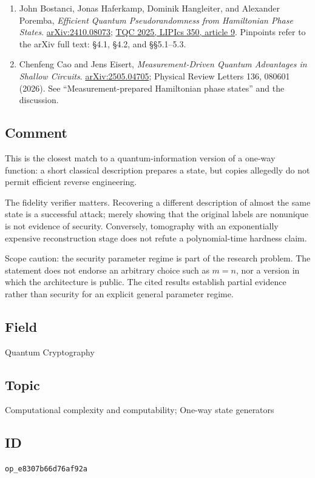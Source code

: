 \begin{enumerate}[label={},leftmargin=4.8em,labelsep=0.5em]
  \footnotesize
  \item[\textup{[Bostanci25]}]\label{ref:e830-bostanci25}
  John Bostanci, Jonas Haferkamp, Dominik Hangleiter, and Alexander Poremba, \emph{Efficient Quantum Pseudorandomness from Hamiltonian Phase States}. \href{https://arxiv.org/html/2410.08073}{arXiv:2410.08073}; \href{https://drops.dagstuhl.de/entities/document/10.4230/LIPIcs.TQC.2025.9}{TQC 2025, LIPIcs 350, article 9}. Pinpoints refer to the arXiv full text: §4.1, §4.2, and §§5.1–5.3.

  \item[\textup{[Cao26]}]\label{ref:e830-cao26}
  Chenfeng Cao and Jens Eisert, \emph{Measurement-Driven Quantum Advantages in Shallow Circuits}. \href{https://arxiv.org/html/2505.04705}{arXiv:2505.04705}; Physical Review Letters 136, 080601 (2026). See “Measurement-prepared Hamiltonian phase states” and the discussion.
\end{enumerate}

\subsection*{Comment}

This is the closest match to a quantum-information version of a one-way function: a short classical description prepares a state, but copies allegedly do not permit efficient reverse engineering.

The fidelity verifier matters. Recovering a different description of almost the same state is a successful attack; merely showing that the original labels are nonunique is not evidence of security. Conversely, tomography with an exponentially expensive reconstruction stage does not refute a polynomial-time hardness claim.

Scope caution: the security parameter regime is part of the research problem. The statement does not endorse an arbitrary choice such as $m=n$, nor a version in which the architecture is public. The cited results establish partial evidence rather than security for an explicit general parameter regime.

\subsection*{Field}

Quantum Cryptography

\subsection*{Topic}

Computational complexity and computability; One-way state generators

\subsection*{ID}

\texttt{op\_e8307b66d76af92a}

